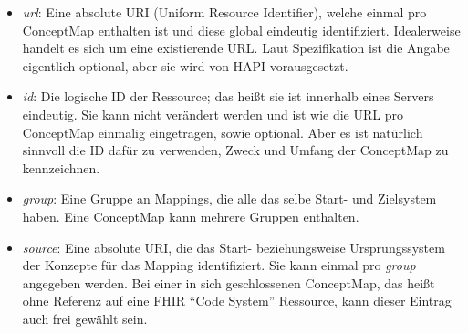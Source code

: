 \begin{itemize}
\item \emph{url}: Eine absolute URI (Uniform Resource Identifier), welche einmal pro ConceptMap enthalten ist und diese global eindeutig identifiziert. Idealerweise handelt es sich um eine existierende URL. Laut Spezifikation ist die Angabe eigentlich optional, aber sie wird von HAPI vorausgesetzt. %
\item \emph{id}: Die logische ID der Ressource; das heißt sie ist innerhalb eines Servers eindeutig. Sie kann nicht verändert werden und ist wie die URL pro ConceptMap einmalig eingetragen, sowie optional. Aber es ist natürlich sinnvoll die ID dafür zu verwenden, Zweck und Umfang der ConceptMap zu kennzeichnen. %
\item \emph{group}: Eine Gruppe an Mappings, die alle das selbe Start- und Zielsystem haben. Eine ConceptMap kann mehrere Gruppen enthalten. %
\item \emph{source}: Eine absolute URI, die das Start- beziehungsweise Ursprungssystem der Konzepte für das Mapping identifiziert. Sie kann einmal pro \emph{group} angegeben werden. Bei einer in sich geschlossenen ConceptMap, das heißt ohne Referenz auf eine FHIR "`Code System"' Ressource, kann dieser Eintrag auch frei gewählt sein. %

\end{itemize}
